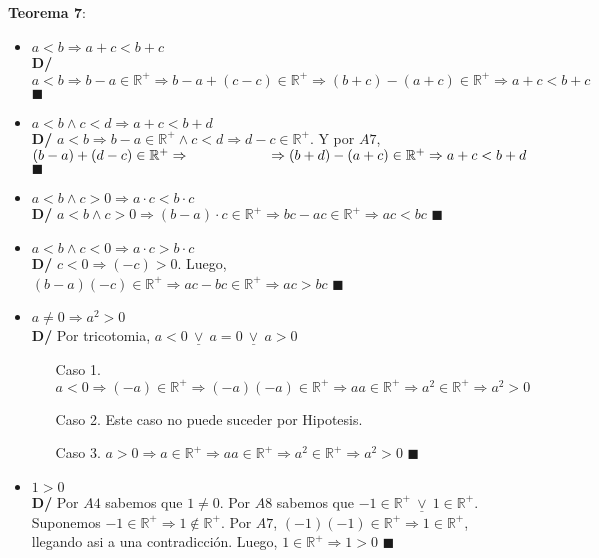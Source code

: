 \documentclass[11pt,a4paper]{article}
\newcommand*{\QEDA}{\null\nobreak\hfill\ensuremath{\blacksquare}}
\begin{document}
\noindent \textbf{Teorema 7}:
\begin{itemize}
\item $a < b \Rightarrow a + c < b + c$\\
\textbf{D/} $a < b \Rightarrow b - a \in \mathbb{R}^+ \Rightarrow b - a + (c - c) \in \mathbb{R}^+ \Rightarrow (b + c) - (a + c) \in \mathbb{R}^+ \Rightarrow a + c < b + c$ \QEDA
\item $a < b \land c < d \Rightarrow a + c < b + d$\\
\textbf{D/} $a < b \Rightarrow b - a \in \mathbb{R}^+ \land c < d \Rightarrow d - c \in \mathbb{R}^+$. Y por $A7$, $(b-a) + (d - c) \in \mathbb{R}^+ \Rightarrow \\ \indent \ \ \ \ \ \ \ \ \ \ \ \ \Rightarrow (b + d) - (a + c) \in \mathbb{R}^+ \Rightarrow a + c < b + d$ \QEDA
\item $a < b \land c > 0 \Rightarrow a \cdot c < b \cdot c$\\
\textbf{D/} $a < b \land c > 0 \Rightarrow (b - a) \cdot c \in \mathbb{R}^+ \Rightarrow bc - ac \in \mathbb{R}^+ \Rightarrow ac < bc$ \QEDA
\item $a < b \land c < 0 \Rightarrow a \cdot c > b \cdot c$\\
\textbf{D/} $c < 0 \Rightarrow (-c) > 0.$ Luego, $(b - a)(-c) \in \mathbb{R}^+ \Rightarrow ac - bc \in \mathbb{R}^+ \Rightarrow ac > bc$ \QEDA
\item $a \not = 0 \Rightarrow a^2 > 0$\\
\textbf{D/} Por tricotomia, $a < 0\ \underline{\lor}\ a = 0\ \underline{\lor}\ a > 0$
\begin{enumerate}
\item [Caso 1. ] $a < 0 \Rightarrow (-a) \in \mathbb{R}^+ \Rightarrow (-a)(-a) \in \mathbb{R}^+ \Rightarrow aa \in \mathbb{R}^+ \Rightarrow a^2 \in \mathbb{R}^+ \Rightarrow a^2 > 0$
\item [Caso 2. ] Este caso no puede suceder por Hipotesis.
\item [Caso 3. ] $a > 0 \Rightarrow a \in \mathbb{R}^+ \Rightarrow aa \in \mathbb{R}^+ \Rightarrow a^2 \in \mathbb{R}^+ \Rightarrow a^2 > 0$ \QEDA
\end{enumerate}
\item $1 > 0$\\
\textbf{D/} Por $A4$ sabemos que $1 \not = 0$. Por $A8$ sabemos que $-1 \in \mathbb{R}^+\ \underline{\lor}\ 1 \in \mathbb{R}^+$.\\ Suponemos $-1 \in \mathbb{R}^+ \Rightarrow 1 \not \in \mathbb{R}^+$. Por $A7$, $(-1)(-1) \in \mathbb{R}^+ \Rightarrow 1 \in \mathbb{R}^+$,\\ llegando asi a una contradicci\'on. Luego, $1 \in \mathbb{R}^+ \Rightarrow 1 > 0$ \QEDA

\end{itemize}
\end{document}
